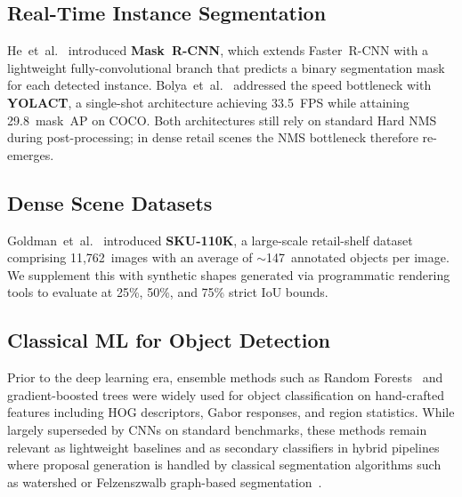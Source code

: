 \documentclass[conference]{IEEEtran}
\begin{document}
\subsection{Real-Time Instance Segmentation}
\label{sec:instance_seg}

He~et~al.~\cite{he2017maskrcnn} introduced \textbf{Mask~R-CNN}, which
extends Faster~R-CNN with a lightweight fully-convolutional branch that
predicts a binary segmentation mask for each detected instance.
Bolya~et~al.~\cite{bolya2019yolact} addressed the speed bottleneck with
\textbf{YOLACT}, a single-shot architecture achieving 33.5~FPS while
attaining 29.8~mask~AP on COCO. Both architectures still rely on
standard Hard NMS during post-processing; in dense retail scenes the NMS
bottleneck therefore re-emerges.

\subsection{Dense Scene Datasets}
\label{sec:datasets}

Goldman~et~al.~\cite{goldman2019sku110k} introduced \textbf{SKU-110K}, a
large-scale retail-shelf dataset comprising 11,762~images with an average of
$\sim$147~annotated objects per image. We supplement
this with synthetic shapes generated via programmatic rendering tools to evaluate
at 25\%, 50\%, and 75\% strict IoU bounds.

\subsection{Classical ML for Object Detection}
\label{sec:ml_related}

Prior to the deep learning era, ensemble methods such as Random
Forests~\cite{breiman2001random} and gradient-boosted trees were widely
used for object classification on hand-crafted features including HOG
descriptors, Gabor responses, and region statistics. While largely
superseded by CNNs on standard benchmarks, these methods remain relevant
as lightweight baselines and as secondary classifiers in hybrid
pipelines where proposal generation is handled by classical segmentation
algorithms such as watershed or Felzenszwalb graph-based
segmentation~\cite{felzenszwalb2004efficient}.


\end{document}
